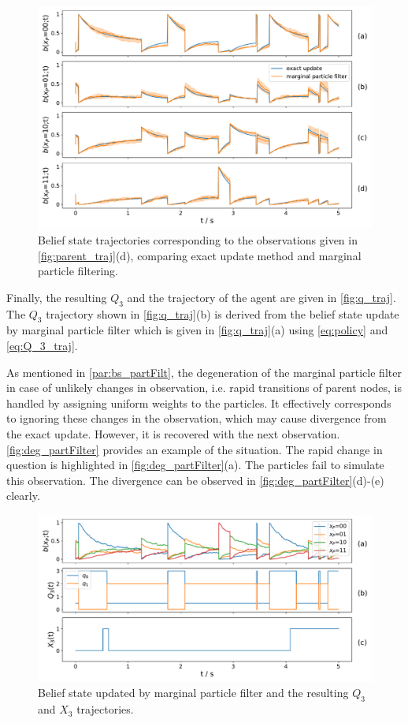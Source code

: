 \begin{figure}[t]
	\begin{center}
		\includegraphics[width=.89\textwidth]{figures/sim_example/belief_traj}
		\caption[Belief state trajectories]{Belief state trajectories corresponding to the observations given in \autoref{fig:parent_traj}(d), comparing exact update method and marginal particle filtering.}
		\label{fig:belief_traj}
	\end{center}
\end{figure}
Finally, the resulting $ Q_3 $ and the trajectory of the agent are given in \autoref{fig:q_traj}. The $ Q_3 $ trajectory shown in \autoref{fig:q_traj}(b) is derived from the belief state update by marginal particle filter which is given in \autoref{fig:q_traj}(a) using \autoref{eq:policy} and \autoref{eq:Q_3_traj}.\par 
As mentioned in \cref{par:bs_partFilt}, the degeneration of the marginal particle filter in case of unlikely changes in observation, i.e. rapid transitions of parent nodes, is handled by assigning uniform weights to the particles. It effectively corresponds to ignoring these changes in the observation, which may cause divergence from the exact update. However, it is recovered with the next observation. \autoref{fig:deg_partFilter} provides an example of the situation. The rapid change in question is highlighted in \autoref{fig:deg_partFilter}(a). The particles fail to simulate this observation. The divergence can be observed in \autoref{fig:deg_partFilter}(d)-(e) clearly.
\begin{figure}[t]
	\begin{center}
		\includegraphics[width=.9\textwidth]{figures/sim_example/q_traj}
		\caption[$ Q_3 $ and $ X_3 $ trajectories]{Belief state updated by marginal particle filter and the resulting $ Q_3 $ and $ X_3 $ trajectories.}
		\label{fig:q_traj}
	\end{center}
\end{figure}
